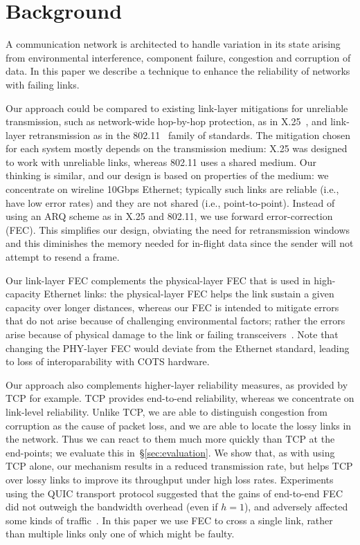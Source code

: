 \section{Background}
A communication network is architected to handle variation in its state
arising from environmental interference, component failure, congestion and
corruption of data. In this paper we describe a technique to enhance the
reliability of networks with failing links.

Our approach could be compared to existing link-layer mitigations for
unreliable transmission, such as network-wide hop-by-hop protection, as in
X.25~\cite{X25}, and link-layer retransmission as in the 802.11~\cite{WiFi} family of
standards. The mitigation chosen for each system mostly depends on
the transmission medium: X.25 was designed to work with unreliable links,
whereas 802.11 uses a shared medium. Our thinking is similar,
and our design is based on properties of the medium: we concentrate on wireline
10Gbps Ethernet; typically such links are reliable (i.e., have low error
rates) and they are not shared (i.e., point-to-point).
Instead of using an ARQ scheme as in X.25 and 802.11, we use forward
error-correction (FEC).
This simplifies our design, obviating the need for retransmission windows and this
diminishes the memory needed for in-flight data since the sender will
not attempt to resend a frame.

Our link-layer FEC complements the physical-layer FEC that is used in
high-capacity Ethernet links: the physical-layer FEC helps the link sustain a
given capacity over longer distances, whereas our FEC is intended to mitigate
errors that do not arise because of challenging environmental factors; rather
the errors arise because of physical damage to the link or failing
transceivers~\cite{Zhuo:2017:UMP:3098822.3098849}.
Note that changing the PHY-layer FEC would deviate from the Ethernet standard,
leading to loss of interoparability with COTS hardware.

Our approach also complements higher-layer reliability measures, as provided by
TCP for example.  TCP provides end-to-end reliability, whereas we concentrate
on link-level reliability. Unlike TCP, we are able to distinguish congestion
from corruption as the cause of packet loss, and we are able to locate the
lossy links in the network. Thus we can react to them much more quickly than
TCP at the end-points; we evaluate this in~\S\ref{sec:evaluation}. We show
that, as with using TCP alone, our mechanism results in a reduced
transmission rate, but \OurSys helps TCP over lossy links to improve its
throughput under high loss rates.
Experiments using the QUIC transport protocol suggested that the gains of
end-to-end FEC did not outweigh the bandwidth overhead (even if $h=1$), and
adversely affected some kinds of
traffic~\cite[\S7.3]{Langley:2017:QTP:3098822.3098842}. In this paper
we use FEC to cross a single link, rather than multiple links only
one of which might be faulty.

